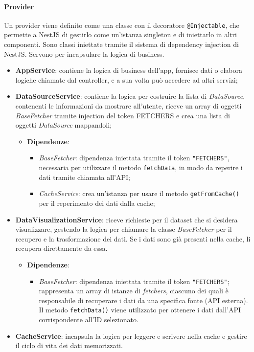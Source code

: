 \paragraph{Provider}
Un provider viene definito come una classe con il decoratore \texttt{@Injectable}, che permette a NestJS di gestirlo come un'istanza singleton e di iniettarlo in altri componenti.
Sono classi iniettate tramite il sistema di dependency injection di NestJS. Servono per incapsulare la logica di business.
\begin{itemize}
    \item \textbf{AppService}: contiene la logica di business dell'app, fornisce dati o elabora logiche chiamate dal controller, e a sua volta può accedere ad altri servizi;
    \item \textbf{DataSourceService}: contiene la logica per costruire la lista di \textit{DataSource}, contenenti le informazioni da mostrare all'utente, riceve un array di oggetti \textit{BaseFetcher} tramite injection del token FETCHERS e crea una lista di oggetti \textit{DataSource} mappandoli;
    \begin{itemize}
        \item \textbf{Dipendenze}:
        \begin{itemize}
            \item \textit{BaseFetcher}: dipendenza iniettata tramite il token \texttt{"FETCHERS"}, necessaria per utilizzare il metodo \texttt{fetchData}, in modo da reperire i dati tramite chiamata all'API;
            \item \textit{CacheService}: crea un'istanza per usare il metodo \texttt{getFromCache()} per il reperimento dei dati dalla cache;
        \end{itemize}
    \end{itemize}
    
    \item \textbf{DataVisualizationService}: riceve richieste per il dataset che si desidera visualizzare, gestendo la logica per chiamare la classe \textit{BaseFetcher} per il recupero e la trasformazione dei dati. Se i dati sono già presenti nella cache, li recupera direttamente da essa.
    \begin{itemize}
        \item \textbf{Dipendenze}:
        \begin{itemize}
            \item \textit{BaseFetcher}: dipendenza iniettata tramite il token \texttt{"FETCHERS"}; rappresenta un array di istanze di \textit{fetchers}, ciascuno dei quali è responsabile di recuperare i dati da una specifica fonte (API esterna). Il metodo \texttt{fetchData()} viene utilizzato per ottenere i dati dall'API corrispondente all'ID selezionato.
        \end{itemize}
    \end{itemize}
    \item \textbf{CacheService}: incapsula la logica per leggere e scrivere nella cache e gestire il ciclo di vita dei dati memorizzati.
\end{itemize}

